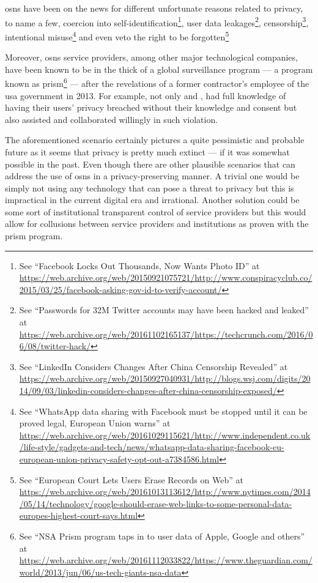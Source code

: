 \documentclass[showtrims,oldfontcommands]{kthesis}
\begin{document}
\acp{osn} have been on the news for different unfortunate reasons related to privacy, 
to name a few, coercion into self-identification\footnote{See ``Facebook Locks Out Thousands, Now Wants Photo ID'' at \url{https://web.archive.org/web/20150921075721/http://www.conspiracyclub.co/2015/03/25/facebook-asking-gov-id-to-verify-account/}}, 
user data leakages\footnote{See ``Passwords for 32M Twitter accounts may have been hacked and leaked'' at \url{https://web.archive.org/web/20161102165137/https://techcrunch.com/2016/06/08/twitter-hack/}}, 
censorship\footnote{See ``LinkedIn Considers Changes After China Censorship Revealed'' at \url{https://web.archive.org/web/20150927040931/http://blogs.wsj.com/digits/2014/09/03/linkedin-considers-changes-after-china-censorship-exposed/}}, 
intentional misuse\footnote{See ``WhatsApp data sharing with Facebook must be stopped until it can be proved legal, European Union warns'' at \url{https://web.archive.org/web/20161029115621/http://www.independent.co.uk/life-style/gadgets-and-tech/news/whatsapp-data-sharing-facebook-eu-european-union-privacy-safety-opt-out-a7384586.html}} 
and even veto the right to be forgotten\footnote{See ``European Court Lets Users Erase Records on Web'' at \url{https://web.archive.org/web/20161013113612/http://www.nytimes.com/2014/05/14/technology/google-should-erase-web-links-to-some-personal-data-europes-highest-court-says.html}}

Moreover, \acp{osn} service providers, among other major technological companies, 
have been known to be in the thick of a global surveillance program --- a program 
known as \Ac{prism}\footnote{See ``NSA Prism program taps in to user data of Apple, Google and others'' at \url{https://web.archive.org/web/20161112033822/https://www.theguardian.com/world/2013/jun/06/us-tech-giants-nsa-data}} --- 
after the revelations of a former contractor's employee of the \ac{usa} government 
in 2013. For example, not only \Facebook and \Google, had full knowledge of having 
their users' privacy breached without their knowledge and consent but also assisted 
and collaborated willingly in such violation.

The aforementioned scenario certainly pictures a quite pessimistic and probable 
future as it seems that privacy is pretty much extinct --- if it was somewhat possible 
in the past. Even though there are other plausible scenarios that can address the 
use of \acp{osn} in a privacy-preserving manner. A trivial one would be simply not 
using any technology that can pose a threat to privacy but this is impractical in 
the current digital era and irrational. Another solution could be some sort of institutional 
transparent control of service providers but this would allow for collusions between 
service providers and institutions as proven with the \ac{prism} program.
\end{document}
